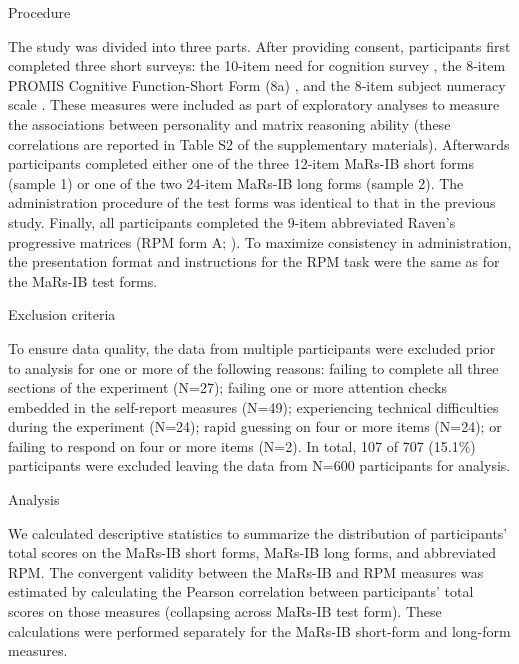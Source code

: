 \documentclass[a4paper,man,natbib]{apa6}
\makeatletter
\renewcommand{\subsubsection}{\@startsection{subsubsection}{3}
  {\z@}%
  {\b@level@two@skip}{\e@level@two@skip}%
  {\normalfont\normalsize\bfseries}}
\makeatother
\begin{document}
\subsubsection{Procedure}

The study was divided into three parts. After providing consent, participants first completed three short surveys: the 10-item need for cognition survey \citep{chiesi2018applying}, the 8-item PROMIS Cognitive Function-Short Form (8a) \citep{iverson2021normative}, and the 8-item subject numeracy scale \citep{fagerlin2007measuring}. These measures were included as part of exploratory analyses to measure the associations between personality and matrix reasoning ability (these correlations are reported in Table S2 of the supplementary materials). Afterwards participants completed either one of the three 12-item MaRs-IB short forms (sample 1) or one of the two 24-item MaRs-IB long forms (sample 2). The administration procedure of the test forms was identical to that in the previous study. Finally, all participants completed the 9-item abbreviated Raven's progressive matrices (RPM form A; \citealt{bilker2012development}). To maximize consistency in administration, the presentation format and instructions for the RPM task were the same as for the MaRs-IB test forms.

\subsubsection{Exclusion criteria}

To ensure data quality, the data from multiple participants were excluded prior to analysis for one or more of the following reasons: failing to complete all three sections of the experiment (N=27); failing one or more attention checks \citep{zorowitz2021inattentive} embedded in the self-report measures (N=49); experiencing technical difficulties during the experiment (N=24); rapid guessing on four or more items (N=24); or failing to respond on four or more items (N=2). In total, 107 of 707 (15.1\%) participants were excluded leaving the data from N=600 participants for analysis.

\subsubsection{Analysis}

We calculated descriptive statistics to summarize the distribution of participants' total scores on the MaRs-IB short forms, MaRs-IB long forms, and abbreviated RPM. The convergent validity between the MaRs-IB and RPM measures was estimated by calculating the Pearson correlation between participants' total scores on those measures (collapsing across MaRs-IB test form). These calculations were performed separately for the MaRs-IB short-form and long-form measures.
\end{document}
